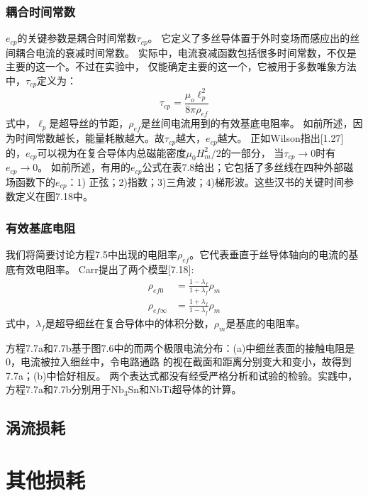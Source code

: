 \subsubsection*{耦合时间常数}
$e_{cp}$的关键参数是耦合时间常数$\tau_{cp}$。
它定义了多丝导体置于外时变场而感应出的丝间耦合电流的衰减时间常数。
实际中，电流衰减函数包括很多时间常数，不仅是主要的这一个。不过在实验中，
仅能确定主要的这一个，它被用于多数唯象方法中，$\tau_{cp}$定义为：
\begin{equation}%
\tau_{cp}=\frac{\mu_o\ell_{p}^{2}}{8\pi\rho_{ef}}
\end{equation}
式中，$\ell_p$是超导丝的节距，$\rho_{ef}$是丝间电流用到的有效基底电阻率。
如前所述，因为时间常数越长，能量耗散越大。故$\tau_{cp}$越大，$e_{cp}$越大。
正如Wilson指出[1.27]的，$e_{cp}$可以视为在复合导体内总磁能密度$\mu_0 H_m^2/2$的一部分，
当$\tau_{cp}\rightarrow 0$时有$e_{cp}\rightarrow 0$。
如前所述，有用的$e_{cp}$公式在表7.8给出；它包括了多丝线在四种外部磁场函数下的$e_{cp}$：1)
正弦；2)指数；3)三角波；4)梯形波。这些汉书的关键时间参数定义在图7.18中。

\subsubsection*{有效基底电阻}
我们将简要讨论方程7.5中出现的电阻率$\rho_{ef}$。它代表垂直于丝导体轴向的电流的基底有效电阻率。
Carr提出了两个模型[7.18]:
\begin{subequations}
	\begin{align}
	\rho_{ef0}&=\frac{1-\lambda_f}{1+\lambda_f}\rho_m\\
	\rho_{ef\infty}&=\frac{1+\lambda_f}{1-\lambda_f}\rho_m
	\end{align}
\end{subequations}
式中，$\lambda_f$是超导细丝在复合导体中的体积分数，$\rho_m$是基底的电阻率。

方程7.7a和7.7b基于图7.6中的而两个极限电流分布：(a)中细丝表面的接触电阻是0，电流被拉入细丝中，令电路通路
的视在截面和距离分别变大和变小，故得到7.7a；(b)中恰好相反。
两个表达式都没有经受严格分析和试验的检验。实践中，方程7.7a和7.7b分别用于$\mathrm{Nb_3Sn}$和NbTi超导体的计算。

\subsection{涡流损耗}

\section{其他损耗}

